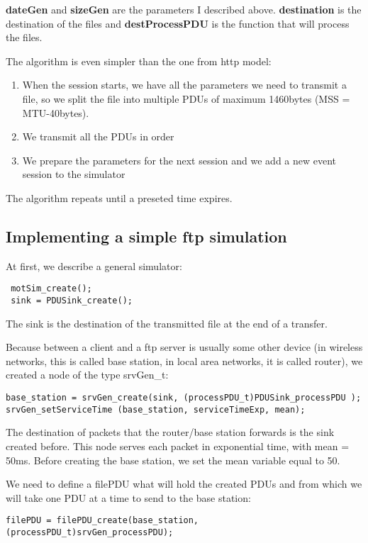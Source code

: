 \textbf{dateGen} and \textbf{sizeGen} are the parameters I described above.
\textbf{destination} is the destination of the files and \textbf{destProcessPDU} is the function that will process the files.

The algorithm is even simpler than the one from http model:
\begin{enumerate}
\item When the session starts, we have all the parameters we need to transmit a file, so we split the file into multiple PDUs of maximum 1460bytes (MSS = MTU-40bytes).
\item We transmit all the PDUs in order
\item We prepare the parameters for the next session and we add a new event session to the simulator
\end{enumerate}
The algorithm repeats until a preseted time expires.

\subsection{Implementing a simple ftp simulation}

At first, we describe a general simulator:

\begin{verbatim}
 motSim_create();
 sink = PDUSink_create();
\end{verbatim}
The sink is the destination of the transmitted file at the end of a transfer.

Because between a client and a ftp server is usually some other device (in wireless networks, this is called base station, in local area networks, it is called router), we created a node of the type srvGen\_t:
\begin{verbatim}
base_station = srvGen_create(sink, (processPDU_t)PDUSink_processPDU );
srvGen_setServiceTime (base_station, serviceTimeExp, mean);
\end{verbatim}
 The destination of packets that the router/base station forwards is the sink created before.
 This node serves each packet in exponential time, with mean = 50ms. Before creating the base station, we set the mean variable equal to 50.

We need to define a filePDU what will hold the created PDUs and from which we will take one PDU at a time to send to the base station:
\begin{verbatim}
filePDU = filePDU_create(base_station, (processPDU_t)srvGen_processPDU);
\end{verbatim}

